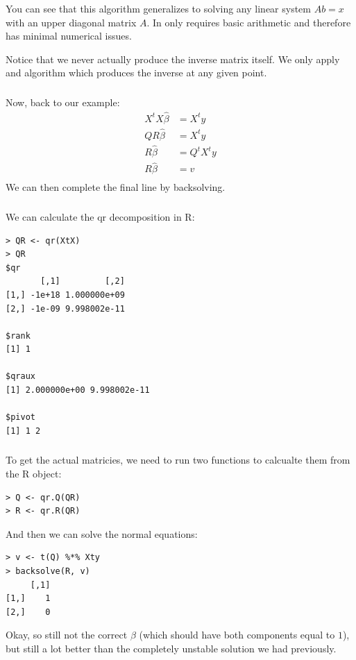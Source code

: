 \begin{frame}[fragile] \frametitle{}

You can see that this algorithm generalizes to solving
any linear system $Ab = x$ with an upper diagonal matrix $A$.
In only requires basic arithmetic and therefore has minimal
numerical issues.

\pause Notice that we never actually produce the inverse
matrix itself. We only apply and algorithm which produces
the inverse at any given point.

\end{frame}

\begin{frame}[fragile] \frametitle{}

Now, back to our example:
\begin{align*}
X^t X \widehat{\beta} &= X^t y \\
Q R \widehat{\beta} &= X^t y \\
R \widehat{\beta} &= Q^t X^t y \\
R \widehat{\beta} &= v \\
\end{align*}
We can then complete the final line by backsolving.

\end{frame}


\begin{frame}[fragile] \frametitle{}

We can calculate the qr decomposition in R:
\begin{verbatim}
> QR <- qr(XtX)
> QR
$qr
       [,1]         [,2]
[1,] -1e+18 1.000000e+09
[2,] -1e-09 9.998002e-11

$rank
[1] 1

$qraux
[1] 2.000000e+00 9.998002e-11

$pivot
[1] 1 2
\end{verbatim}

\end{frame}

\begin{frame}[fragile] \frametitle{}

To get the actual matricies, we need to run two functions
to calcualte them from the R object:
\begin{verbatim}
> Q <- qr.Q(QR)
> R <- qr.R(QR)
\end{verbatim}
And then we can solve the normal equations:
\begin{verbatim}
> v <- t(Q) %*% Xty
> backsolve(R, v)
     [,1]
[1,]    1
[2,]    0
\end{verbatim}
\pause Okay, so still not the correct $\beta$ (which should
have both components equal to $1$), but still a lot better
than the completely unstable solution we had previously.

\end{frame}

